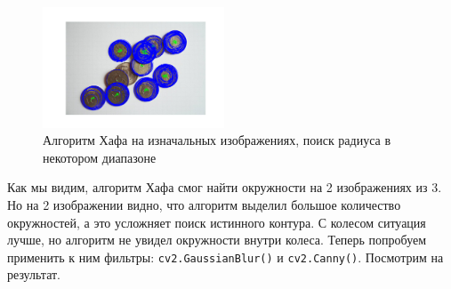 \documentclass[a4paper,12pt]{article}
\begin{document}
\begin{figure}[H]
\begin{minipage}{0.48\textwidth}
    \end{minipage}
    \includegraphics[width=0.48\textwidth]{images/hough_circles/2_orig_range.png}
    \caption{Алгоритм Хафа на изначальных изображениях, поиск радиуса в некотором диапазоне}
\end{figure}

\noindent Как мы видим, алгоритм Хафа смог найти окружности на 2 изображениях из 3. Но на 2 изображении видно, что алгоритм выделил большое количество окружностей, а это усложняет поиск истинного контура. С колесом ситуация лучше, но алгоритм не увидел окружности внутри колеса. Теперь попробуем применить к ним фильтры: \texttt{cv2.GaussianBlur()} и \texttt{cv2.Canny()}. Посмотрим на результат.
\end{document}
